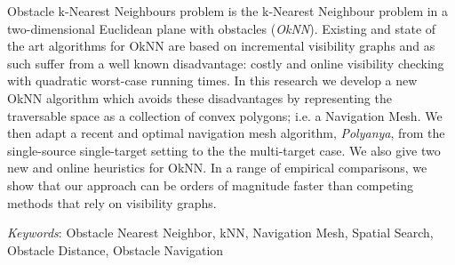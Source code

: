 Obstacle k-Nearest Neighbours problem is the k-Nearest Neighbour problem in a 
two-dimensional Euclidean plane with obstacles (\emph{OkNN}).
Existing and state of the art algorithms for OkNN are based on incremental 
visibility graphs and as such suffer from a well known disadvantage: costly 
and online visibility checking with quadratic worst-case running times.
In this research we develop a new OkNN algorithm which avoids these disadvantages
by representing the traversable space as a collection of convex polygons; i.e.
a Navigation Mesh. 
We then adapt a recent and optimal navigation mesh algorithm, \textit{Polyanya}, from the
single-source single-target setting to the the multi-target case. 
We also give two new and online heuristics for OkNN.
In a range of empirical comparisons, we show that our approach can be orders of magnitude faster than competing methods that rely on visibility graphs.

\textit{Keywords}: Obstacle Nearest Neighbor, kNN, Navigation Mesh, Spatial Search, Obstacle
Distance, Obstacle Navigation
